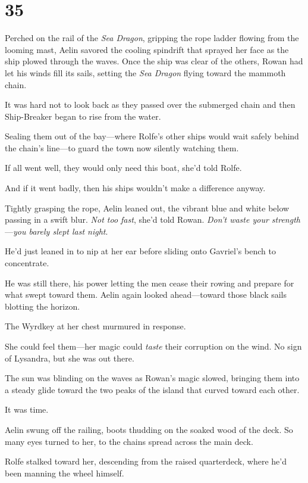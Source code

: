 
\chapter{35}

Perched on the rail of the \emph{Sea Dragon}, gripping the rope ladder flowing from the looming mast, Aelin savored the cooling spindrift that sprayed her face as the ship plowed through the waves. Once the ship was clear of the others, Rowan had let his winds fill its sails, setting the
\emph{Sea Dragon} flying toward the mammoth chain.

It was hard not to look back as they passed over the submerged chain
 and then Ship-Breaker began to rise from the water.

Sealing them out of the bay---where Rolfe's other ships would wait safely behind the chain's line---to guard the town now silently watching them.

If all went well, they would only need this boat, she'd told Rolfe.

And if it went badly, then his ships wouldn't make a difference anyway.

Tightly grasping the rope, Aelin leaned out, the vibrant blue and white below passing in a swift blur. \emph{Not too fast}, she'd told Rowan.
\emph{Don't waste your strength} ---\emph{you barely slept last night}.

He'd just leaned in to nip at her ear before sliding onto Gavriel's bench to concentrate.

He was still there, his power letting the men cease their rowing and prepare for what swept toward them. Aelin again looked ahead---toward those black sails blotting the horizon.

The Wyrdkey at her chest murmured in response.

She could feel them---her magic could \emph{taste} their corruption on the wind. No sign of Lysandra, but she was out there.

The sun was blinding on the waves as Rowan's magic slowed, bringing them into a steady glide toward the two peaks of the island that curved toward each other.

It was time.

Aelin swung off the railing, boots thudding on the soaked wood of the deck. So many eyes turned to her, to the chains spread across the main deck.

Rolfe stalked toward her, descending from the raised quarterdeck, where he'd been manning the wheel himself.

